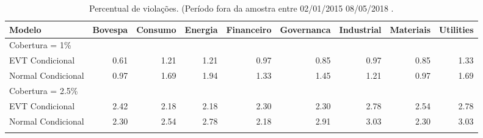 \begin{longtable}{lrrrrrrrr}
\caption{Percentual de violações. (Período fora da amostra entre 02/01/2015 08/05/2018 .} \\ 
  \toprule
Modelo & Bovespa & Consumo & Energia & Financeiro & Governanca & Industrial & Materiais & Utilities \\ 
  \midrule
Cobertura = 1\% &  &  &  &  &  &  &  &  \\ 
  EVT Condicional & 0.61 & 1.21 & 1.21 & 0.97 & 0.85 & 0.97 & 0.85 & 1.33 \\ 
  Normal Condicional & 0.97 & 1.69 & 1.94 & 1.33 & 1.45 & 1.21 & 0.97 & 1.69 \\ 
  Cobertura = 2.5\% &  &  &  &  &  &  &  &  \\ 
  EVT Condicional & 2.42 & 2.18 & 2.18 & 2.30 & 2.30 & 2.78 & 2.54 & 2.78 \\ 
  Normal Condicional & 2.30 & 2.54 & 2.78 & 2.18 & 2.91 & 3.03 & 2.30 & 3.03 \\ 
   \bottomrule
\label{tab:varviol}
\end{longtable}
